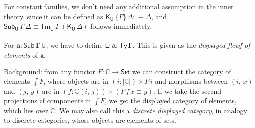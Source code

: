 \documentclass[12pt,a4paper,twoside,openany]{book}
\theoremstyle{remark}
\theoremstyle{definition}
\theoremstyle{theorem}
\newcommand{\mbb}[1]{\mathbb{#1}}
\newcommand{\bs}[1]{\boldsymbol{#1}}
\newcommand{\Sub}{\mathsf{Sub}}
\newcommand{\Tm}{\mathsf{Tm}}
\newcommand{\Ty}{\mathsf{Ty}}
\newcommand{\U}{\mathsf{U}}
\newcommand{\El}{\mathsf{El}}
\newcommand{\Set}{\mathsf{Set}}
\newcommand{\K}{\mathsf{K}}
\newcommand{\ba}{\bs{a}}
\newcommand{\bU}{\bs{\U}}
\newcommand{\mbbC}{\mbb{C}}
\newcommand{\defn}{:\equiv}
\begin{document}
For constant families, we don't need any additional assumption in the inner
theory, since it can be defined as $\K_{\bU}\,\{\Gamma\}\,\Delta \defn \Delta$,
and $\Sub_{\bU}\,\Gamma\,\Delta \equiv \Tm_{\bU}\,\Gamma\,(\K_{\bU}\,\Delta)$
follows immediately.
\\\\
\indent For $\bs{a : \Sub\,\Gamma\,\U}$, we have to define $\bs{\El\,a :
  \Ty\,\Gamma}$. This is given as the \emph{displayed flcwf of elements} of
$\ba$.

Background: from any functor $F : \mbbC \to \bs{\Set}$ we can construct the
category of elements $\int\!F$, where objects are in $(i : |\mbbC|) \times F\,i$
and morphisms between $(i,\,x)$ and $(j,\,y)$ are in $(f : \mbbC(i,\,j)) \times
(F\,f\,x \equiv y)$. If we take the second projections of components in $\int\!F$,
we get the displayed category of elements, which lies over $\mbbC$. We may also call
this a \emph{discrete displayed category}, in analogy to discrete categories, whose
objects are elements of sets.
\end{document}
